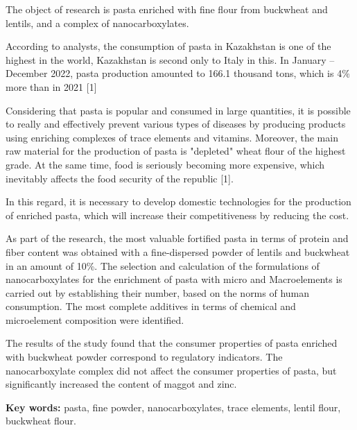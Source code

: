 The object of research is pasta enriched with fine flour from buckwheat
and lentils, and a complex of nanocarboxylates.

According to analysts, the consumption of pasta in Kazakhstan is one of
the highest in the world, Kazakhstan is second only to Italy in this. In
January -- December 2022, pasta production amounted to 166.1 thousand
tons, which is 4\% more than in 2021 {[}1{]}

Considering that pasta is popular and consumed in large quantities, it
is possible to really and effectively prevent various types of diseases
by producing products using enriching complexes of trace elements and
vitamins. Moreover, the main raw material for the production of pasta is
"depleted" wheat flour of the highest grade. At the same time, food is
seriously becoming more expensive, which inevitably affects the food
security of the republic {[}1{]}.

In this regard, it is necessary to develop domestic technologies for the
production of enriched pasta, which will increase their competitiveness
by reducing the cost.

As part of the research, the most valuable fortified pasta in terms of
protein and fiber content was obtained with a fine-dispersed powder of
lentils and buckwheat in an amount of 10\%. The selection and
calculation of the formulations of nanocarboxylates for the enrichment
of pasta with micro and Macroelements is carried out by establishing
their number, based on the norms of human consumption. The most complete
additives in terms of chemical and microelement composition were
identified.

The results of the study found that the consumer properties of pasta
enriched with buckwheat powder correspond to regulatory indicators. The
nanocarboxylate complex did not affect the consumer properties of pasta,
but significantly increased the content of maggot and zinc.

{\bfseries Key words:} pasta, fine powder, nanocarboxylates, trace
elements, lentil flour, buckwheat flour.

